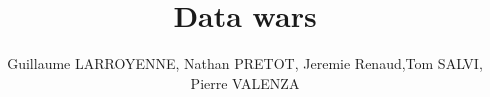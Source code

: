 \documentclass[a4paper,11pt]{report}
\title{Data wars}
\author{Guillaume LARROYENNE, Nathan PRETOT, Jeremie Renaud,Tom SALVI, Pierre VALENZA}
\begin{document}
\maketitle
\tableofcontents

\begin{abstract}
\end{abstract}

\chapter{}
\end{document}
